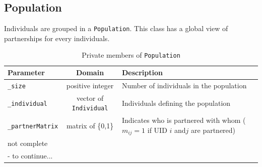 \documentclass[11pt, onecolumn]{article}
\newcommand{\ttt}[1]{\texttt{#1}}
\begin{document}
\subsection{Population}

Individuals are grouped in a \ttt{Population}. This class has a global view of partnerships for every individuals.

\begin{table}[htdp]
\begin{footnotesize}
\begin{center}
\begin{tabular}{|l|c|l|}
\hline
Parameter  & Domain & Description\\
\hline 
\ttt{\_size} & positive integer & Number of individuals in the population\\
\ttt{\_individual} & vector of \ttt{Individual} & Individuals defining the population\\
\ttt{\_partnerMatrix} & matrix of \{0,1\} & Indicates who is partnered with whom ($m_{ij}=1$ if UID $i$ and$j$ are partnered)\\

not complete \\ - to continue... & & \\
\hline
\end{tabular}
\caption{Private members of \ttt{Population}}
\label{tab:populationClass}
\end{center}
\end{footnotesize}
\end{table}
\end{document}

